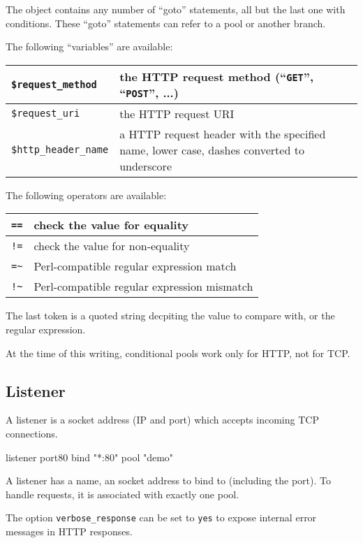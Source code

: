 \documentclass[a4paper,12pt]{article}
\begin{document}
The object contains any number of ``goto'' statements, all but the
last one with conditions.  These ``goto'' statements can refer to a
pool or another branch.

The following ``variables'' are available:

\smallskip
\noindent\begin{tabularx}{\textwidth}{|l|X|}
\hline
\verb|$request_method| & the HTTP request method (``\texttt{GET}'',
``\texttt{POST}'', ...) \\
\hline
\verb|$request_uri| & the HTTP request URI \\
\hline
\verb|$http_header_name| & a HTTP request header with the
specified name, lower case, dashes converted to underscore \\
\hline
\end{tabularx}
\smallskip

The following operators are available:

\smallskip
\noindent\begin{tabularx}{\textwidth}{|l|X|}
\hline
\verb|==| & check the value for equality \\
\hline
\verb|!=| & check the value for non-equality \\
\hline
\verb|=~| & Perl-compatible regular expression match \\
\hline
\verb|!~| & Perl-compatible regular expression mismatch \\
\hline
\end{tabularx}
\smallskip

The last token is a quoted string decpiting the value to compare with,
or the regular expression.

At the time of this writing, conditional pools work only for HTTP, not
for TCP.

\subsection{Listener}

A listener is a socket address (IP and port) which accepts incoming
TCP connections.

\begin{verbatim*}
listener port80 {
  bind "*:80"
  pool "demo"
}
\end{verbatim*}

A listener has a name, an socket address to bind to (including the
port).  To handle requests, it is associated with exactly one pool.

The option \verb|verbose_response| can be set to \texttt{yes} to
expose internal error messages in HTTP responses.
\end{document}
